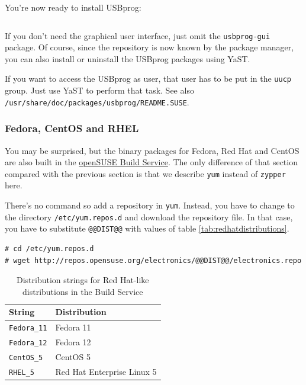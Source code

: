 \documentclass[bibtotoc,UKenglish,halfparskip,oneside,DIV12]{scrreprt}
\begin{document}
\begin{lstlisting}[style=inline]
% sudo zypper ref
\end{lstlisting}

You're now ready to install USBprog:

\begin{lstlisting}[style=inline]
% sudo zypper install usbprog usbprog-gui
\end{lstlisting}

If you don't need the graphical user interface, just omit the \texttt{usbprog-gui} package. Of
course, since the repository is now known by the package manager, you can also install or uninstall
the USBprog packages using YaST.

If you want to access the USBprog as user, that user has to be put in the \texttt{uucp} group. Just
use YaST to perform that task. See also \texttt{/usr/share/doc/packages/usbprog/README.SUSE}.

\subsubsection{Fedora, CentOS and RHEL}

You may be surprised, but the binary packages for Fedora, Red Hat and CentOS are also built in the
\href{https://build.opensuse.org/}{openSUSE Build Service}. The only difference of that section
compared with the previous section is that we describe \texttt{yum} instead of \texttt{zypper} here.

There's no command so add a repository in \texttt{yum}. Instead, you have to change to the directory
\texttt{/etc/yum.repos.d} and download the repository file. In that case, you have to substitute
\texttt{@@DIST@@} with values of table \vref{tab:redhatdistributions}.

\begin{lstlisting}[style=inline]
% su
# cd /etc/yum.repos.d
# wget http://repos.opensuse.org/electronics/@@DIST@@/electronics.repo
\end{lstlisting}

\begin{table}[htb]
  \centering
  \begin{tabular}{|p{4cm}p{10cm}|}
    \hline
    \textbf{String}                 & \textbf{Distribution}                               \\
    \hline
    \hline
    \texttt{Fedora\_11}             & Fedora 11                                           \\
    \texttt{Fedora\_12}             & Fedora 12                                           \\
    \texttt{CentOS\_5}              & CentOS 5                                            \\
    \texttt{RHEL\_5}                & Red Hat Enterprise Linux 5                          \\
    \hline
  \end{tabular}
  \caption{Distribution strings for Red Hat-like distributions in the Build Service}
  \label{tab:redhatdistributions}
\end{table}
\end{document}

